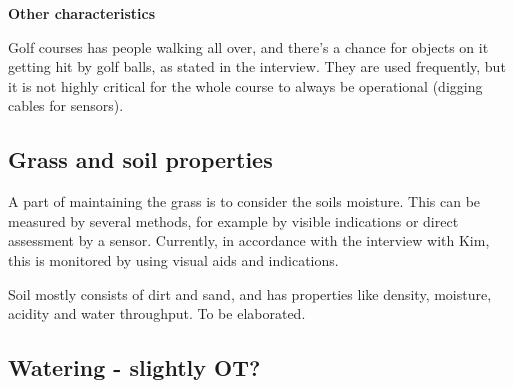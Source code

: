 \textbf{Other characteristics}

Golf courses has people walking all over, and there's a chance for objects on it getting hit by golf balls, as stated in the interview. They are used frequently, but it is not highly critical for the whole course to always be operational (digging cables for sensors). 



\subsection{Grass and soil properties}

A part of maintaining the grass is to consider the soils moisture\cite{golfGrass}. This can be measured by several methods, for example by visible indications or direct assessment by a sensor. Currently, in accordance with the interview with Kim, this is monitored by using visual aids and indications. 

Soil mostly consists of dirt and sand, and has properties like density, moisture, acidity and water throughput. To be elaborated.


\subsection{Watering - slightly OT?}
